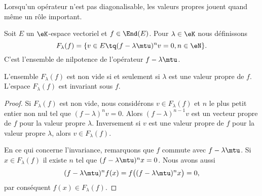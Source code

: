 Lorsqu'un opérateur n'est pas diagonalisable, les valeurs propres jouent quand même un rôle important.

Soit \( E\) un \( \eK\)-espace vectoriel et \( f\in\End(E)\). Pour \( \lambda\in \eK\) nous définissons
\begin{equation}
    F_{\lambda}(f)=\{ v\in E\tq (f-\lambda\mtu)^nv=0, n\in\eN \}.
\end{equation}
C'est l'ensemble de nilpotence de l'opérateur \( f-\lambda\mtu\).

\begin{lemma}
    L'ensemble \( F_{\lambda}(f)\) est non vide si et seulement si \( \lambda\) est une valeur propre de \( f\). L'espace \( F_{\lambda}(f)\) est invariant sous \( f\).
\end{lemma}

\begin{proof}
    Si \( F_{\lambda}(f)\) est non vide, nous considérons \( v\in F_{\lambda}(f)\) et \( n\) le plus petit entier non nul tel que \( (f-\lambda)^nv=0\). Alors \( (f-\lambda)^{n-1}v\) est un vecteur propre de \( f\) pour la valeur propre \( \lambda\). Inversement si \( v\) est une valeur propre de \( f\) pour la valeur propre \( \lambda\), alors \( v\in F_{\lambda}(f)\).

    En ce qui concerne l'invariance, remarquons que \( f\) commute avec \( f-\lambda\mtu\). Si \( x\in F_{\lambda}(f)\) il existe \( n\) tel que \( (f-\lambda\mtu)^nx=0\). Nous avons aussi
    \begin{equation}
        (f-\lambda\mtu)^nf(x)=f\big( (f-\lambda\mtu)^nx \big)=0,
    \end{equation}
    par conséquent \( f(x)\in F_{\lambda}(f)\).
\end{proof}


